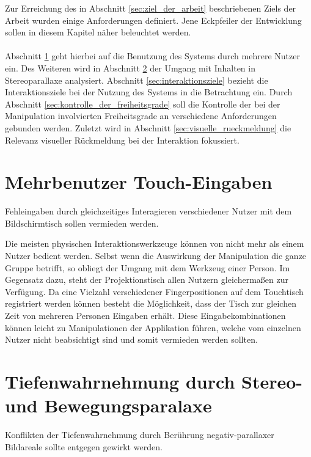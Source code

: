 Zur Erreichung des in Abschnitt \ref{sec:ziel_der_arbeit} beschriebenen Ziels der Arbeit wurden einige Anforderungen definiert. Jene Eckpfeiler der Entwicklung sollen in diesem Kapitel näher beleuchtet werden. 
\\\\
Abschnitt \ref{sec:mehrbenutzer_touch_eingaben} geht hierbei auf die Benutzung des Systems durch mehrere Nutzer ein. Des Weiteren wird in Abschnitt \ref{sec:tiefenwahrnehmung} der Umgang mit Inhalten in Stereoparallaxe analysiert.  Abschnitt \ref{sec:interaktionsziele} bezieht die Interaktionsziele bei der Nutzung des Systems in die Betrachtung ein. Durch Abschnitt \ref{sec:kontrolle_der_freiheitsgrade} soll die Kontrolle der bei der Manipulation involvierten Freiheitsgrade an verschiedene Anforderungen gebunden werden. Zuletzt wird in Abschnitt \ref{sec:visuelle_rueckmeldung} die Relevanz visueller Rückmeldung bei der Interaktion fokussiert. 


\section{Mehrbenutzer Touch-Eingaben}
\label{sec:mehrbenutzer_touch_eingaben}

	\begin{anforderung}
	\label{req:mehrbenutzer}
		Fehleingaben durch gleichzeitiges Interagieren verschiedener Nutzer mit dem Bildschirmtisch sollen vermieden werden.
	\end{anforderung}

Die meisten physischen Interaktionswerkzeuge können von nicht mehr als einem Nutzer bedient werden.  Selbst wenn die Auswirkung der Manipulation die ganze Gruppe betrifft, so obliegt der Umgang mit dem Werkzeug einer Person. Im Gegensatz dazu, steht der Projektionstisch allen Nutzern gleichermaßen zur Verfügung. Da eine Vielzahl verschiedener Fingerpositionen auf dem Touchtisch registriert werden können besteht die Möglichkeit, dass der Tisch zur gleichen Zeit von mehreren Personen Eingaben erhält. Diese Eingabekombinationen können leicht zu Manipulationen der Applikation führen, welche vom einzelnen Nutzer nicht beabsichtigt sind und somit vermieden werden sollten.


\section{Tiefenwahrnehmung durch Stereo- und Bewegungsparalaxe}
\label{sec:tiefenwahrnehmung}

	\begin{anforderung}
	\label{req:wahrnehmungskonflikte}
		Konflikten der Tiefenwahrnehmung durch Berührung negativ-parallaxer Bildareale sollte entgegen gewirkt werden.
	\end{anforderung}

